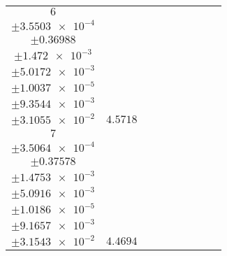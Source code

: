 \documentclass[8pt]{article}
\begin{document}
\begin{longtable}[l]{c c c c c c c c c}
$\num{6}$ & \begin{tabular}[c]{@{}c@{}}$\num{5.5278e-2}$ \\ $\pm\num{3.5503e-4}$\end{tabular} & \begin{tabular}[c]{@{}c@{}}$\num{-0.383}$ \\ $\pm\num{0.36988}$\end{tabular} & \begin{tabular}[c]{@{}c@{}}$\num{-3.415}$ \\ $\pm\num{1.472e-3}$\end{tabular} & \begin{tabular}[c]{@{}c@{}}$\num{2.0713e+3}$ \\ $\pm\num{5.0172e-3}$\end{tabular} & \begin{tabular}[c]{@{}c@{}}$\num{4.1437}$ \\ $\pm\num{1.0037e-5}$\end{tabular} & \begin{tabular}[c]{@{}c@{}}$\num{1.1941}$ \\ $\pm\num{9.3544e-3}$\end{tabular} & \begin{tabular}[c]{@{}c@{}}$\num{4.193}$ \\ $\pm\num{3.1055e-2}$\end{tabular} & $\num{4.5718}$\\
$\num{7}$ & \begin{tabular}[c]{@{}c@{}}$\num{5.4009e-2}$ \\ $\pm\num{3.5064e-4}$\end{tabular} & \begin{tabular}[c]{@{}c@{}}$\num{-0.20103}$ \\ $\pm\num{0.37578}$\end{tabular} & \begin{tabular}[c]{@{}c@{}}$\num{3.4157}$ \\ $\pm\num{1.4753e-3}$\end{tabular} & \begin{tabular}[c]{@{}c@{}}$\num{2.0781e+3}$ \\ $\pm\num{5.0916e-3}$\end{tabular} & \begin{tabular}[c]{@{}c@{}}$\num{4.1573}$ \\ $\pm\num{1.0186e-5}$\end{tabular} & \begin{tabular}[c]{@{}c@{}}$\num{1.1632}$ \\ $\pm\num{9.1657e-3}$\end{tabular} & \begin{tabular}[c]{@{}c@{}}$\num{4.2061}$ \\ $\pm\num{3.1543e-2}$\end{tabular} & $\num{4.4694}$\\

\end{longtable}
\end{document}

